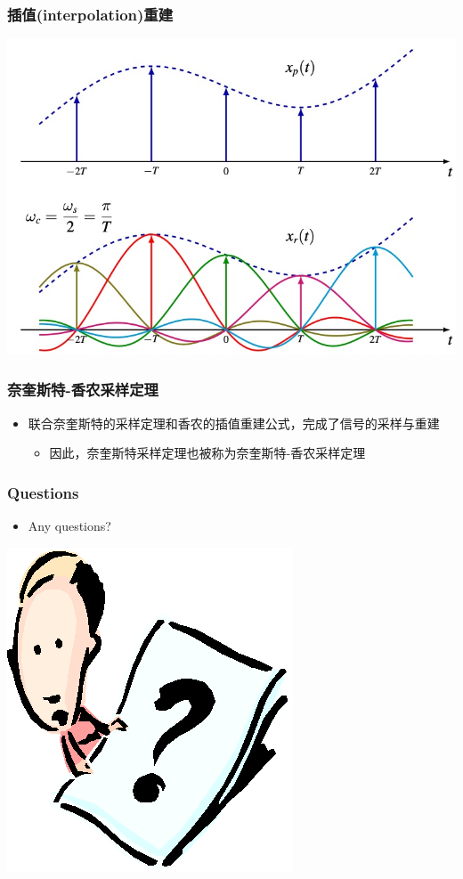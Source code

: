 \documentclass[CJKutf8,xcolor=pdftex,dvipsnames,table]{beamer}
\begin{document}
\begin{CJK*}{UTF8}{song}
  \begin{frame}
    \frametitle{插值(interpolation)重建}
    \begin{center}
      \includegraphics[scale=.4]{reconstruction}
    \end{center}
  \end{frame} 
  
  \begin{frame}
    \frametitle{奈奎斯特-香农采样定理}
	\begin{itemize}
	\item 联合奈奎斯特的采样定理和香农的插值重建公式，完成了信号的采样与重建
		\begin{itemize}
		\item 因此，奈奎斯特采样定理也被称为奈奎斯特-香农采样定理
		\end{itemize}
	\end{itemize}
  \end{frame}   
  
  \begin{frame}
    \frametitle{Questions}
    \begin{itemize}
    \item Any questions?
    \end{itemize}
    \begin{center}
      \includegraphics[scale=.5]{question}
    \end{center}
  \end{frame} 


\end{CJK*}
\end{document}
